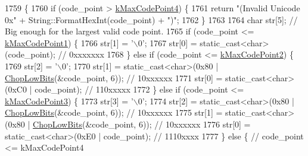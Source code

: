 \begin{DoxyCode}
1759                                              \{
1760   \textcolor{keywordflow}{if} (code\_point > \hyperlink{namespacetesting_1_1internal_acd87c60be9b5fedb2d017503d8834474}{kMaxCodePoint4}) \{
1761     \textcolor{keywordflow}{return} \textcolor{stringliteral}{"(Invalid Unicode 0x"} + String::FormatHexInt(code\_point) + \textcolor{stringliteral}{")"};
1762   \}
1763 
1764   \textcolor{keywordtype}{char} str[5];  \textcolor{comment}{// Big enough for the largest valid code point.}
1765   \textcolor{keywordflow}{if} (code\_point <= \hyperlink{namespacetesting_1_1internal_a128515c8ed6c0fe98e498c8042da2060}{kMaxCodePoint1}) \{
1766     str[1] = \textcolor{charliteral}{'\(\backslash\)0'};
1767     str[0] = \textcolor{keyword}{static\_cast<}\textcolor{keywordtype}{char}\textcolor{keyword}{>}(code\_point);                          \textcolor{comment}{// 0xxxxxxx}
1768   \} \textcolor{keywordflow}{else} \textcolor{keywordflow}{if} (code\_point <= \hyperlink{namespacetesting_1_1internal_ab8f4a5ed784352f00342cfeadc72337e}{kMaxCodePoint2}) \{
1769     str[2] = \textcolor{charliteral}{'\(\backslash\)0'};
1770     str[1] = \textcolor{keyword}{static\_cast<}\textcolor{keywordtype}{char}\textcolor{keyword}{>}(0x80 | \hyperlink{namespacetesting_1_1internal_a2c54b453387aa8a18f2f3e09f10b5a7d}{ChopLowBits}(&code\_point, 6));  \textcolor{comment}{// 10xxxxxx}
1771     str[0] = \textcolor{keyword}{static\_cast<}\textcolor{keywordtype}{char}\textcolor{keyword}{>}(0xC0 | code\_point);                   \textcolor{comment}{// 110xxxxx}
1772   \} \textcolor{keywordflow}{else} \textcolor{keywordflow}{if} (code\_point <= \hyperlink{namespacetesting_1_1internal_aa42bd507418e570402996e33582beed3}{kMaxCodePoint3}) \{
1773     str[3] = \textcolor{charliteral}{'\(\backslash\)0'};
1774     str[2] = \textcolor{keyword}{static\_cast<}\textcolor{keywordtype}{char}\textcolor{keyword}{>}(0x80 | \hyperlink{namespacetesting_1_1internal_a2c54b453387aa8a18f2f3e09f10b5a7d}{ChopLowBits}(&code\_point, 6));  \textcolor{comment}{// 10xxxxxx}
1775     str[1] = \textcolor{keyword}{static\_cast<}\textcolor{keywordtype}{char}\textcolor{keyword}{>}(0x80 | \hyperlink{namespacetesting_1_1internal_a2c54b453387aa8a18f2f3e09f10b5a7d}{ChopLowBits}(&code\_point, 6));  \textcolor{comment}{// 10xxxxxx}
1776     str[0] = \textcolor{keyword}{static\_cast<}\textcolor{keywordtype}{char}\textcolor{keyword}{>}(0xE0 | code\_point);                   \textcolor{comment}{// 1110xxxx}
1777   \} \textcolor{keywordflow}{else} \{  \textcolor{comment}{// code\_point <= kMaxCodePoint4}

\end{DoxyCode}

